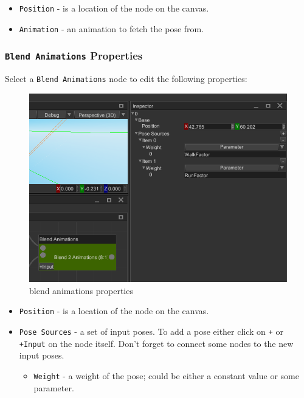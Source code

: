 \documentclass[
]{book}
\providecommand{\tightlist}{%
  \setlength{\itemsep}{0pt}\setlength{\parskip}{0pt}}
\theoremstyle{definition}
\theoremstyle{definition}
\theoremstyle{definition}
\theoremstyle{definition}
\theoremstyle{remark}
\begin{document}
\begin{itemize}
\tightlist
\item
  \texttt{Position} - is a location of the node on the canvas.
\item
  \texttt{Animation} - an animation to fetch the pose from.
\end{itemize}

\subsubsection{\texorpdfstring{\texttt{Blend\ Animations} Properties}{Blend Animations Properties}}\label{blend-animations-properties}

Select a \texttt{Blend\ Animations} node to edit the following properties:

\begin{figure}
\centering
\includegraphics{images/animation/absm_blend_animations_properties.png}
\caption{blend animations properties}
\end{figure}

\begin{itemize}
\tightlist
\item
  \texttt{Position} - is a location of the node on the canvas.
\item
  \texttt{Pose\ Sources} - a set of input poses. To add a pose either click on \texttt{+} or \texttt{+Input} on the node itself. Don't forget to connect some nodes to the new input poses.

  \begin{itemize}
  \tightlist
  \item
    \texttt{Weight} - a weight of the pose; could be either a constant value or some parameter.
  \end{itemize}
\end{itemize}
\end{document}
